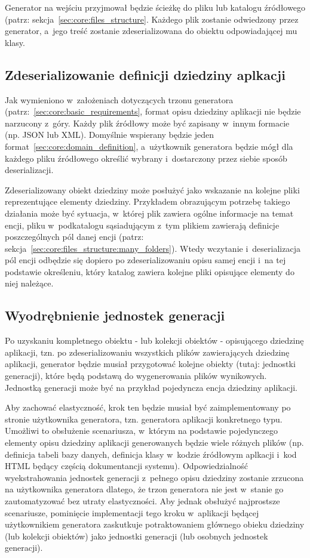 Generator na wejściu przyjmował będzie ścieżkę do pliku lub katalogu źródłowego (patrz: sekcja~\ref{sec:core:files_structure}.
Każdego plik zostanie odwiedzony przez generator, a~jego treść zostanie zdeserializowana do obiektu odpowiadającej mu klasy.


\subsection{Zdeserializowanie definicji dziedziny aplkacji}

Jak wymieniono w~założeniach dotyczących trzonu generatora (patrz:~\ref{sec:core:basic_requirements}, format opisu dziedziny aplikacji nie będzie narzucony z~góry.
Każdy plik źródłowy może być zapisany w~innym formacie (np. JSON lub XML).
Domyślnie wspierany będzie jeden format~\ref{sec:core:domain_definition}, a~użytkownik generatora będzie mógł dla każdego pliku źródłowego określić wybrany i~dostarczony przez siebie sposób deserializacji.

Zdeserializowany obiekt dziedziny może posłużyć jako wskazanie na kolejne pliki reprezentujące elementy dziedziny.
Przykładem obrazującym potrzebę takiego działania może być sytuacja, w~której plik zawiera ogólne informacje na temat encji, pliku w~podkatalogu sąsiadującym z~tym plikiem zawierają definicje poszczególnych pól danej encji (patrz: sekcja~\ref{sec:core:files_structure:many_folders}).
Wtedy wczytanie i~deserializacja pól encji odbędzie się dopiero po zdeserializowaniu opisu samej encji i~na tej podstawie określeniu, który katalog zawiera kolejne pliki opisujące elementy do niej należące. 


\subsection{Wyodrębnienie jednostek generacji}

Po uzyskaniu kompletnego obiektu - lub kolekcji obiektów - opisującego dziedzinę aplikacji, tzn. po zdeserializowaniu wszystkich plików zawierających dziedzinę aplikacji, generator będzie musiał przygotować kolejne obiekty (tutaj: jednostki generacji), które będą podstawą do wygenerowania plików wynikowych.
Jednostką generacji może być na przykład pojedyncza encja dziedziny aplikacji.

Aby zachować elastyczność, krok ten będzie musiał być zaimplementowany po stronie użytkownika generatora, tzn. generatora aplikacji konkretnego typu.
Umożliwi to obsłużenie scenariusza, w~którym na podstawie pojedynczego elementy opisu dziedziny aplikacji generowanych będzie wiele różnych plików (np. definicja tabeli bazy danych, definicja klasy w~kodzie źródłowym aplkacji i~kod HTML będący częścią dokumentancji systemu).
Odpowiedzialność wyekstrahowania jednostek generacji z~pełnego opisu dziedziny zostanie zrzucona na użytkownika generatora dlatego, że trzon generatora nie jest w~stanie go zautomatyzować bez utraty elastyczności.
Aby jednak obsłużyć najprostsze scenariusze, pominięcie implementacji tego kroku w~aplikacji będącej użytkownikiem generatora zaskutkuje potraktowaniem głównego obieku dziedziny (lub kolekcji obiektów) jako jednostki generacji (lub osobnych jednostek generacji).


